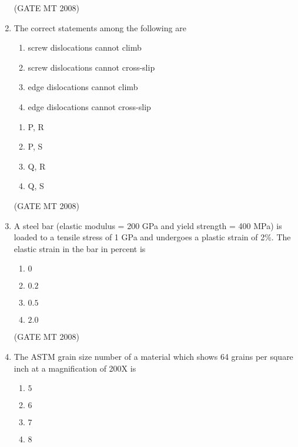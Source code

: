 \documentclass[journal, 11pt, onecolumn]{IEEEtran}
\theoremstyle{remark}
\begin{document}
\begin{enumerate}
\hfill(GATE MT 2008)

\item The correct statements among the following are
\begin{enumerate}
    \item screw dislocations cannot climb
    \item screw dislocations cannot cross-slip
    \item edge dislocations cannot climb
    \item edge dislocations cannot cross-slip
\end{enumerate}

\begin{multicols}{4}
\begin{enumerate}
\item P, R
\item P, S
\item Q, R
\item Q, S
\end{enumerate}
\end{multicols}

\hfill(GATE MT 2008)

\item A steel bar (elastic modulus = 200 GPa and yield strength = 400 MPa) is loaded to a tensile stress of 1 GPa and undergoes a plastic strain of 2\%. The elastic strain in the bar in percent is

\begin{multicols}{4}
\begin{enumerate}
\item $0$
\item $0.2$
\item $0.5$
\item $2.0$
\end{enumerate}
\end{multicols}

\hfill(GATE MT 2008)



\item The ASTM grain size number of a material which shows 64 grains per square inch at a magnification of 200X is

\begin{multicols}{4}
\begin{enumerate}
\item $5$
\item $6$
\item $7$
\item $8$
\end{enumerate}
\end{multicols}


\end{enumerate}
\end{document}

